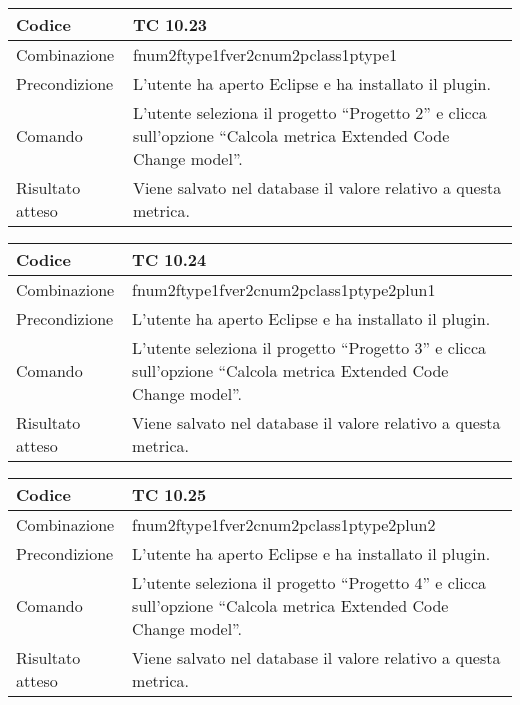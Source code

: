 \begin{table}[ht]
\begin{tabular}{|p{3cm}|p{9cm}|}
\hline
\cellcolor{lightgray}Codice				& TC 10.23								\\
\hline
\cellcolor{lightgray}Combinazione		& fnum2ftype1fver2cnum2pclass1ptype1									\\
\hline
\cellcolor{lightgray}Precondizione		& L'utente ha aperto Eclipse e ha installato il plugin.		\\
\hline
\cellcolor{lightgray}Comando			& L'utente seleziona il progetto ``Progetto 2''  e clicca sull'opzione ``Calcola metrica Extended Code Change model''.	\\
\hline
\cellcolor{lightgray}Risultato atteso	& Viene salvato nel database il valore relativo a questa metrica.\\
\hline
\end{tabular}
\end{table}


\begin{table}[ht]
\begin{tabular}{|p{3cm}|p{9cm}|}
\hline
\cellcolor{lightgray}Codice				& TC 10.24								\\
\hline
\cellcolor{lightgray}Combinazione		& fnum2ftype1fver2cnum2pclass1ptype2plun1									\\
\hline
\cellcolor{lightgray}Precondizione		& L'utente ha aperto Eclipse e ha installato il plugin.		\\
\hline
\cellcolor{lightgray}Comando			& L'utente seleziona il progetto ``Progetto 3''  e clicca sull'opzione ``Calcola metrica Extended Code Change model''.	\\
\hline
\cellcolor{lightgray}Risultato atteso	& Viene salvato nel database il valore relativo a questa metrica.\\
\hline
\end{tabular}
\end{table}


\begin{table}[ht]
\begin{tabular}{|p{3cm}|p{9cm}|}
\hline
\cellcolor{lightgray}Codice				& TC 10.25								\\
\hline
\cellcolor{lightgray}Combinazione		& fnum2ftype1fver2cnum2pclass1ptype2plun2									\\
\hline
\cellcolor{lightgray}Precondizione		& L'utente ha aperto Eclipse e ha installato il plugin.		\\
\hline
\cellcolor{lightgray}Comando			& L'utente seleziona il progetto ``Progetto 4''  e clicca sull'opzione ``Calcola metrica Extended Code Change model''.	\\
\hline
\cellcolor{lightgray}Risultato atteso	& Viene salvato nel database il valore relativo a questa metrica.\\
\hline
\end{tabular}
\end{table}


